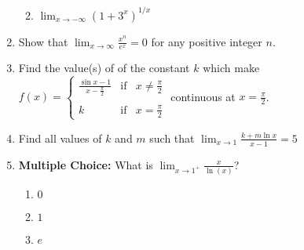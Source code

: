 \documentclass[12pt]{article}
\newif\ifans
\begin{document}
\begin{enumerate}
\begin{enumerate}
\ifans{\fbox{$3$}} \fi

\item $\lim_{x \rightarrow -\infty}{(1+3^x)^{1/x}}$

\ifans{\fbox{$1$}} \fi

\end{enumerate}

\item Show that $\lim_{x \rightarrow \infty}{\frac{x^n}{e^x}}=0$ for any positive integer $n$.

\ifans{\fbox{\parbox{1\linewidth}{$\lim_{x \rightarrow \infty}{\frac{x^n}{e^x}}$ is of the indeterminate form $\frac{\infty}{\infty}$, so, we may apply L'Hopital's Rule:
$$\lim_{x \rightarrow \infty}{\frac{x^n}{e^x}}=\lim_{x \rightarrow \infty}{\frac{nx^{n-1}}{e^x}}$$
This new limit is also of the indeterminate form $\frac{\infty}{\infty}$, so, we may again apply L'Hopital's Rule:
$$\lim_{x \rightarrow \infty}{\frac{nx^{n-1}}{e^x}}=\lim_{x \rightarrow \infty}{\frac{n(n-1)x^{n-2}}{e^x}}$$
In fact, we repeat the process until we end up with the following limit:
$$\lim_{x \rightarrow \infty}{\frac{n(n-1)(n-2)\dots(2)(1)}{e^x}}$$
which equals 0.  Thus, $\lim_{x \rightarrow \infty}{\frac{x^n}{e^x}}=0$}}} \fi

\item Find the value(s) of of the constant $k$ which make $f(x)=\left\{\begin{array}{lll}
\frac{\sin{x}-1}{x-\frac{\pi}{2}} & \text{if} & x \neq \frac{\pi}{2}\\
&&\\
k & \text{if} & x=\frac{\pi}{2}
\end{array}\right.$ continuous at $x=\frac{\pi}{2}$.

\ifans{\fbox{$k=0$}} \fi

\item Find all values of $k$ and $m$ such that $\lim_{x \rightarrow 1}{\frac{k+m\ln{x}}{x-1}}=5$

\ifans{\fbox{$k=0$ and $m=5$}} \fi

\item {\bf Multiple Choice:} What is $\displaystyle \lim_{x\rightarrow 1^+} \frac{x}{\ln(x)}$?

\begin{enumerate}

\item $0$

\item $1$

\item $e$


\end{enumerate}
\end{enumerate}
\end{document}
